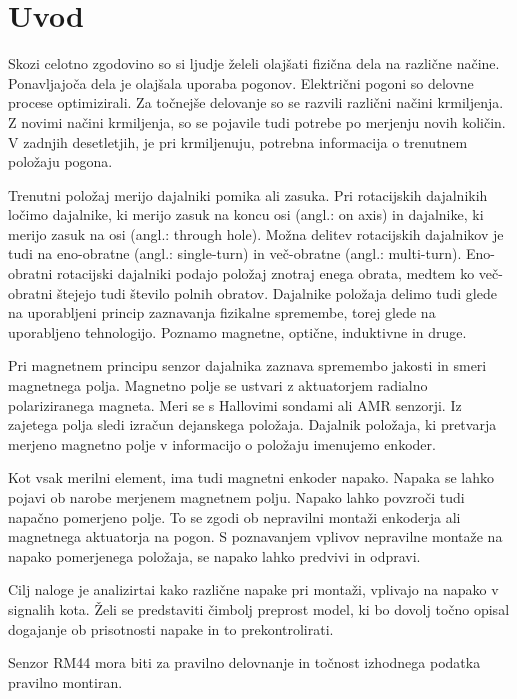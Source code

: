 \chapter{Uvod} \label{uvod}

Skozi celotno zgodovino so si ljudje želeli olajšati fizična dela na različne načine. Ponavljajoča dela je olajšala uporaba pogonov. Električni pogoni so delovne procese optimizirali. Za točnejše delovanje so se razvili različni načini krmiljenja. Z novimi načini krmiljenja, so se pojavile tudi potrebe po merjenju novih količin. V zadnjih desetletjih, je pri krmiljenuju, potrebna informacija o trenutnem položaju pogona.

Trenutni položaj merijo dajalniki pomika ali zasuka\cite{uporabaSenzorjev}. Pri rotacijskih dajalnikih ločimo dajalnike, ki merijo zasuk na koncu osi (angl.: on axis) in dajalnike, ki merijo zasuk na osi (angl.: through hole). Možna delitev rotacijskih dajalnikov je tudi na eno-obratne (angl.: single-turn) in več-obratne (angl.: multi-turn). Eno-obratni rotacijski dajalniki podajo položaj znotraj enega obrata, medtem ko več-obratni štejejo tudi število polnih obratov. Dajalnike položaja delimo tudi glede na uporabljeni princip zaznavanja fizikalne
spremembe, torej glede na uporabljeno tehnologijo. Poznamo magnetne, optične,
induktivne in druge\cite{killer}.

Pri magnetnem principu senzor dajalnika zaznava spremembo jakosti in smeri
magnetnega polja. 
Magnetno polje se ustvari z aktuatorjem radialno polariziranega magneta. Meri se s Hallovimi sondami ali AMR senzorji. Iz zajetega polja sledi izračun dejanskega položaja. Dajalnik položaja, ki pretvarja merjeno magnetno polje v informacijo o položaju imenujemo enkoder\cite{enkoder}.

Kot vsak merilni element, ima tudi magnetni enkoder napako. Napaka se lahko pojavi ob narobe merjenem magnetnem polju\cite{RLS3}. Napako lahko povzroči tudi napačno pomerjeno polje. To se zgodi ob nepravilni montaži enkoderja ali magnetnega aktuatorja na pogon. S poznavanjem vplivov nepravilne montaže na napako pomerjenega položaja, se napako lahko predvivi in odpravi.

Cilj naloge je analizirtai kako različne napake pri montaži, vplivajo na napako v signalih kota.
Želi se predstaviti čimbolj preprost model, ki bo dovolj točno opisal dogajanje ob prisotnosti napake in to prekontrolirati.

Senzor RM44 mora biti za pravilno delovnanje in točnost izhodnega podatka pravilno montiran.%


